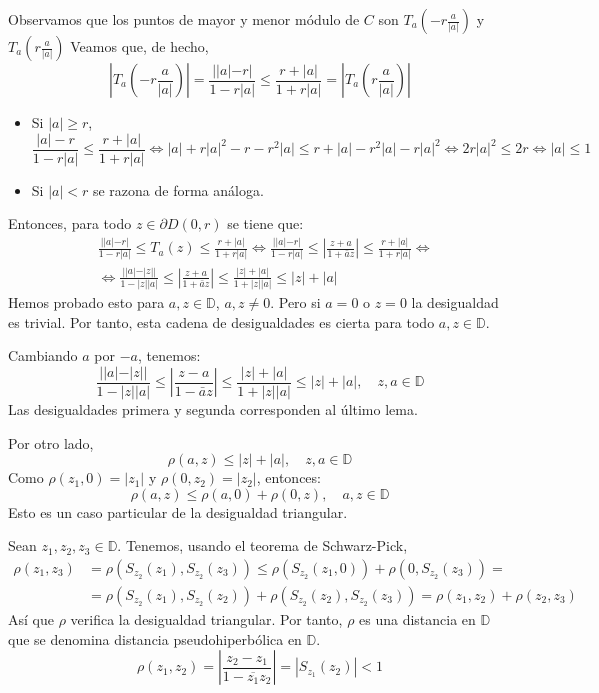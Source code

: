 Observamos que los puntos de mayor y menor módulo de $C$ son $T_a\left(-r\frac{a}{|a|}\right)$ y $T_a\left(r\frac{a}{|a|}\right)$
Veamos que, de hecho,
$$\left|T_a\left(-r\frac{a}{|a|}\right)\right| = \frac{||a|-r|}{1-r|a|} \leq \frac{r+|a|}{1+r|a|} = \left|T_a\left(r\frac{a}{|a|}\right)\right|$$
\begin{itemize}
    \item Si $|a| \geq r$,
          $$\frac{|a|-r}{1-r|a|} \leq \frac{r+|a|}{1+r|a|} \Leftrightarrow |a| + r|a|^2 - r - r^2|a| \leq r + |a| - r^2|a| - r|a|^2 \Leftrightarrow 2r|a|^2 \leq 2r \Leftrightarrow |a| \leq 1$$
    \item Si $|a| < r$ se razona de forma análoga.
\end{itemize}

Entonces, para todo $z \in \partial D(0, r)$ se tiene que:
\begin{align*}
     & \frac{||a|-r|}{1-r|a|} \leq T_a(z) \leq \frac{r+|a|}{1+r|a|} \Leftrightarrow \frac{||a|-r|}{1-r|a|} \leq \left|\frac{z+a}{1+\bar{a}z}\right| \leq \frac{r+|a|}{1+r|a|} \Leftrightarrow \\
     & \Leftrightarrow \frac{||a|-|z||}{1-|z||a|} \leq \left|\frac{z+a}{1+\bar{a}z}\right| \leq \frac{|z|+|a|}{1+|z||a|} \leq |z|+|a|
\end{align*}
Hemos probado esto para $a, z \in \mathbb{D}$, $a, z \neq 0$.
Pero si $a = 0$ o $z = 0$ la desigualdad es trivial.
Por tanto, esta cadena de desigualdades es cierta para todo $a, z \in \mathbb{D}$.

Cambiando $a$ por $-a$, tenemos:
$$\frac{||a|-|z||}{1-|z||a|} \leq \left|\frac{z-a}{1-\bar{a}z}\right| \leq \frac{|z|+|a|}{1+|z||a|} \leq |z|+|a|, \quad z, a \in \mathbb{D}$$
Las desigualdades primera y segunda corresponden al último lema.

Por otro lado,
$$\rho(a, z) \leq |z| + |a|, \quad z, a \in \mathbb{D}$$
Como $\rho(z_1, 0) = |z_1|$ y $\rho(0, z_2) = |z_2|$, entonces:
$$\rho(a, z) \leq \rho(a, 0) + \rho(0, z), \quad a, z \in \mathbb{D}$$
Esto es un caso particular de la desigualdad triangular.

Sean $z_1, z_2, z_3 \in \mathbb{D}$.
Tenemos, usando el teorema de Schwarz-Pick,
\begin{align*}
    \rho(z_1, z_3) & = \rho(S_{z_2}(z_1), S_{z_2}(z_3)) \leq \rho(S_{z_2}(z_1, 0)) + \rho(0, S_{z_2}(z_3)) =                 \\
                   & = \rho(S_{z_2}(z_1), S_{z_2}(z_2)) + \rho(S_{z_2}(z_2), S_{z_2}(z_3)) = \rho(z_1, z_2) + \rho(z_2, z_3)
\end{align*}
Así que $\rho$ verifica la desigualdad triangular.
Por tanto, $\rho$ es una distancia en $\mathbb{D}$ que se denomina distancia pseudohiperbólica en $\mathbb{D}$.
$$\rho(z_1, z_2) = \left|\frac{z_2-z_1}{1-\overline{z_1}z_2}\right| = |S_{z_1}(z_2)| < 1$$

